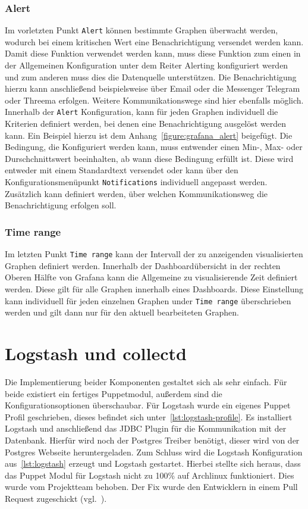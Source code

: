 {\subsubsection{Alert}
Im vorletzten Punkt \texttt{Alert} können bestimmte Graphen überwacht werden,
wodurch bei einem kritischen Wert eine Benachrichtigung versendet werden kann.
Damit diese Funktion verwendet werden kann, muss diese Funktion zum einen in
der Allgemeinen Konfiguration unter dem Reiter Alerting konfiguriert werden und
zum anderen muss dies die Datenquelle unterstützen. Die Benachrichtigung hierzu
kann anschließend beispielsweise über Email oder die Messenger Telegram oder
Threema erfolgen. Weitere Kommunikationswege sind hier ebenfalls möglich.
Innerhalb der \texttt{Alert} Konfiguration, kann für jeden Graphen individuell
die Kriterien definiert werden, bei denen eine Benachrichtigung ausgelöst
werden kann. Ein Beispiel hierzu ist dem Anhang~\ref{figure:grafana_alert}
beigefügt. Die Bedingung, die Konfiguriert werden kann, muss entwender einen
Min-, Max- oder Durschchnittswert beeinhalten, ab wann diese Bedingung erfüllt
ist. Diese wird entweder mit einem Standardtext versendet oder kann über den
Konfigurationsmenüpunkt \texttt{Notifications} individuell angepasst werden.
Zusätzlich kann definiert werden, über welchen Kommunikationsweg die
Benachrichtigung erfolgen soll.
\mr%

\subsubsection{Time range}
Im letzten Punkt \texttt{Time range} kann der Intervall der zu anzeigenden
visualisierten Graphen definiert werden. Innerhalb der Dashboardübersicht in
der rechten Oberen Hälfte von Grafana kann die Allgemeine zu visualisierende
Zeit definiert werden. Diese gilt für alle Graphen innerhalb eines Dashboards.
Diese Einstellung kann individuell für jeden einzelnen Graphen under
\texttt{Time range} überschrieben werden und gilt dann nur für den aktuell
bearbeiteten Graphen.
\mr%

\section{Logstash und collectd}
Die Implementierung beider Komponenten gestaltet sich als sehr einfach. Für
beide existiert ein fertiges Puppetmodul, außerdem sind die
Konfigurationsoptionen überschaubar. Für Logstash wurde ein eigenes Puppet
Profil geschrieben, dieses befindet sich unter~\ref{lst:logstash-profile}. Es
installiert Logstash und anschließend das JDBC Plugin für die Kommunikation mit
der Datenbank. Hierfür wird noch der Postgres Treiber benötigt, dieser wird von
der Postgres Webseite heruntergeladen. Zum Schluss wird die Logstash
Konfiguration aus~\ref{lst:logstash} erzeugt und Logstash gestartet. Hierbei
stellte sich heraus, dass das Puppet Modul für Logstash nicht zu 100\% auf
Archlinux funktioniert. Dies wurde vom Projektteam behoben. Der Fix wurde den
Entwicklern in einem Pull Request zugeschickt (vgl.~\cite{logstash-bug}).

}
